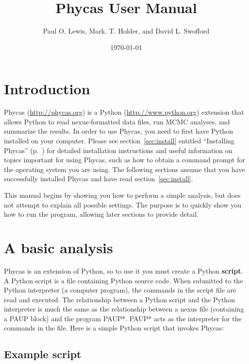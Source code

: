 \documentclass[10pt]{article}
\newcommand{\term}[1]{{\bfseries #1}\index{#1}}
\begin{document}
\title{Phycas User Manual}
\author{Paul O. Lewis, Mark. T. Holder, and David L. Swofford}
\date{\today}
\maketitle

\tableofcontents

\section{Introduction}

Phycas (\url{http://phycas.org}) is a Python (\url{http://www.python.org}) extension that allows Python to read nexus-formatted data files, run MCMC analyses, and summarize the results. In order to use Phycas, you need to first have Python installed on your computer. Please see section~\ref{sec:install} entitled ``Installing Phycas'' (p.~\pageref{sec:install}) for detailed installation instructions and useful information on topics important for using Phycas, such as how to obtain a command prompt for the operating system you are using. The following sections assume that you have successfully installed Phycas and have read section~\ref{sec:install}.

This manual begins by showing you how to perform a simple analysis, but does not attempt to explain all possible settings. The purpose is to quickly show you how to run the program, allowing later sections to provide detail. 

\section{A basic analysis} \label{sec:basic}

Phycas is an extension of Python, so to use it you must create a Python \term{script}. A Python script is a file containing Python source code. When submitted to the Python interpreter (a computer program), the commands in the script file are read and executed. The relationship between a Python script and the Python interpreter is much the same as the relationship between a nexus file (containing a PAUP block) and the program PAUP*. PAUP* acts as the interpreter for the commands in the file. Here is a simple Python script that invokes Phycas:

\subsection{Example script}
\end{document}
